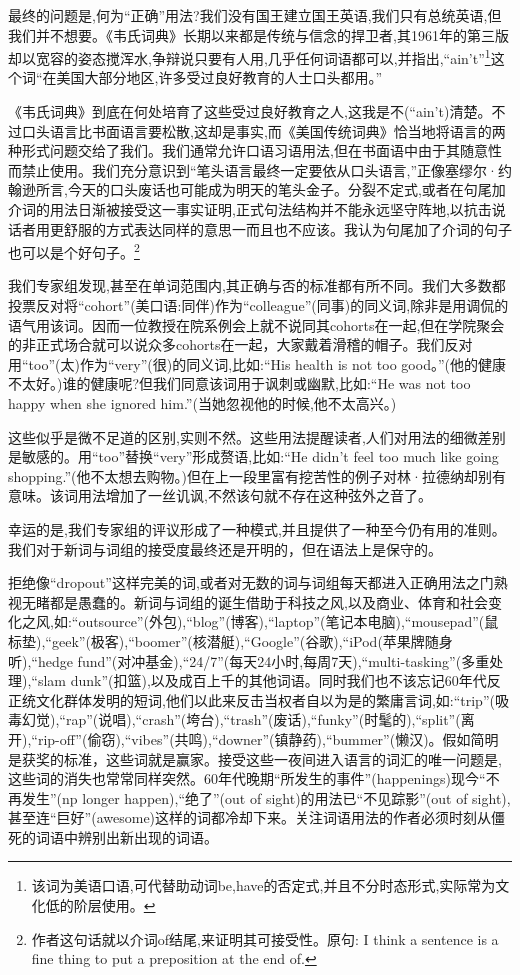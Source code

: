 最终的问题是,何为“正确”用法?我们没有国王建立国王英语,我们只有总统英语,但我们并不想要。《韦氏词典》长期以来都是传统与信念的捍卫者,其1961年的第三版却以宽容的姿态搅浑水,争辩说只要有人用,几乎任何词语都可以,并指出,“ain’t”\footnote{该词为美语口语,可代替助动词be,have的否定式,并且不分时态形式,实际常为文化低的阶层使用。}这个词“在美国大部分地区,许多受过良好教育的人士口头都用。”

《韦氏词典》到底在何处培育了这些受过良好教育之人,这我是不(“ain’t)清楚。不过口头语言比书面语言要松散,这却是事实,而《美国传统词典》恰当地将语言的两种形式问题交给了我们。我们通常允许口语习语用法,但在书面语中由于其随意性而禁止使用。我们充分意识到“笔头语言最终一定要依从口头语言,”正像塞缪尔·约翰逊所言,今天的口头废话也可能成为明天的笔头金子。分裂不定式,或者在句尾加介词的用法日渐被接受这一事实证明,正式句法结构并不能永远坚守阵地,以抗击说话者用更舒服的方式表达同样的意思一而且也不应该。我认为句尾加了介词的句子也可以是个好句子。\footnote{作者这句话就以介词of结尾,来证明其可接受性。原句: I think a sentence is a fine thing to put a preposition at the end of.}

我们专家组发现,甚至在单词范围内,其正确与否的标准都有所不同。我们大多数都投票反对将“cohort”(美口语:同伴)作为“colleague”(同事)的同义词,除非是用调侃的语气用该词。因而一位教授在院系例会上就不说同其cohorts在一起,但在学院聚会的非正式场合就可以说众多cohorts在一起，大家戴着滑稽的帽子。我们反对用“too”(太)作为“very”(很)的同义词,比如:“His health is not too good。”(他的健康不太好。)谁的健康呢?但我们同意该词用于讽刺或幽默,比如:“He was not too happy when she ignored him.”(当她忽视他的时候,他不太高兴。)

这些似乎是微不足道的区别,实则不然。这些用法提醒读者,人们对用法的细微差别是敏感的。用“too”替换“very”形成赘语,比如:“He didn’t feel too much like going shopping.”(他不太想去购物。)但在上一段里富有挖苦性的例子对林·拉德纳却别有意味。该词用法增加了一丝讥讽,不然该句就不存在这种弦外之音了。

幸运的是,我们专家组的评议形成了一种模式,并且提供了一种至今仍有用的准则。我们对于新词与词组的接受度最终还是开明的，但在语法上是保守的。

拒绝像“dropout”这样完美的词,或者对无数的词与词组每天都进入正确用法之门熟视无睹都是愚蠢的。新词与词组的诞生借助于科技之风,以及商业、体育和社会变化之风,如:“outsource”(外包),“blog”(博客),“laptop”(笔记本电脑),“mousepad”(鼠标垫),“geek”(极客),“boomer”(核潜艇),“Google”(谷歌),“iPod(苹果牌随身听),“hedge fund”(对冲基金),“24/7”(每天24小时,每周7天),“multi-tasking”(多重处理),“slam dunk”(扣篮),以及成百上千的其他词语。同时我们也不该忘记60年代反正统文化群体发明的短词,他们以此来反击当权者自以为是的繁庸言词,如:“trip”(吸毒幻觉),“rap”(说唱),“crash”(垮台),“trash”(废话),“funky”(时髦的),“split”(离开),“rip-off”(偷窃),“vibes”(共鸣),“downer”(镇静药),“bummer”(懒汉)。假如简明是获奖的标准，这些词就是赢家。接受这些一夜间进入语言的词汇的唯一问题是,这些词的消失也常常同样突然。60年代晚期“所发生的事件”(happenings)现今“不再发生”(np longer happen),“绝了”(out of sight)的用法已“不见踪影”(out of sight),甚至连“巨好”(awesome)这样的词都冷却下来。关注词语用法的作者必须时刻从僵死的词语中辨别出新出现的词语。

